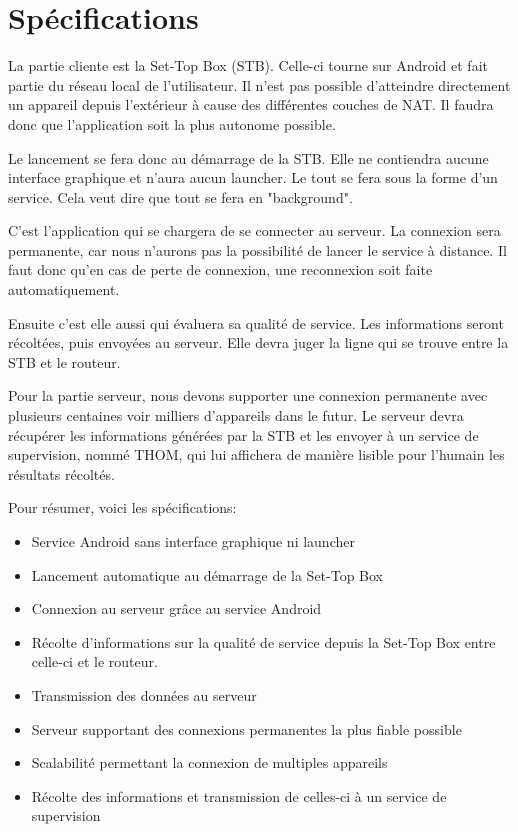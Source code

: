 
\chapter{Spécifications}
La partie cliente est la Set-Top Box (STB). Celle-ci tourne sur Android et fait partie du réseau local de l'utilisateur. Il n'est pas possible d'atteindre directement un appareil depuis l'extérieur à cause des différentes couches de NAT. Il faudra donc que l'application soit la plus autonome possible. 

\medskip

Le lancement se fera donc au démarrage de la STB. Elle ne contiendra aucune interface graphique et n'aura aucun launcher. Le tout se fera sous la forme d'un service. Cela veut dire que tout se fera en "background".

\medskip

C'est l'application qui se chargera de se connecter au serveur. La connexion sera permanente, car nous n'aurons pas la possibilité de lancer le service à distance. Il faut donc qu'en cas de perte de connexion, une reconnexion soit faite automatiquement.

\medskip

Ensuite c'est elle aussi qui évaluera sa qualité de service. Les informations seront récoltées, puis envoyées au serveur. Elle devra juger la ligne qui se trouve entre la STB et le routeur.

\medskip

Pour la partie serveur, nous devons supporter une connexion permanente avec plusieurs centaines voir milliers d'appareils dans le futur. Le serveur devra récupérer les informations générées par la STB et les envoyer à un service de supervision, nommé THOM, qui lui affichera de manière lisible pour l'humain les résultats récoltés.

\medskip

Pour résumer, voici les spécifications:

\medskip

\begin{itemize}
	\item Service Android sans interface graphique ni launcher
	\item Lancement automatique au démarrage de la Set-Top Box
	\item Connexion au serveur grâce au service Android
	\item Récolte d'informations sur la qualité de service depuis la Set-Top Box entre celle-ci et le routeur.
	\item Transmission des données au serveur
	\item Serveur supportant des connexions permanentes la plus fiable possible
	\item Scalabilité permettant la connexion de multiples appareils
	\item Récolte des informations et transmission de celles-ci à un service de supervision
\end{itemize}



